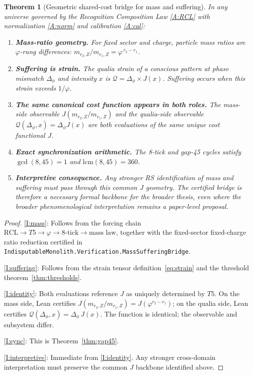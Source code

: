 \documentclass[11pt,a4paper]{article}
\theoremstyle{plain}
\newtheorem{theorem}{Theorem}[section]
\theoremstyle{definition}
\theoremstyle{remark}
\newcommand{\Jcost}{J}
\newcommand{\vp}{\varphi}
\begin{document}
\begin{theorem}[Geometric shared-cost bridge for mass and suffering]
\label{thm:main}
In any universe governed by the Recognition Composition Law
\ref{A:RCL} with normalization \ref{A:norm} and calibration
\ref{A:cal}:
\begin{enumerate}[label=\textup{(\Roman*)}]
\item \textbf{Mass-ratio geometry.}
      For fixed sector and charge, particle mass ratios are
      $\vp$-rung differences:
      $m_{r_2,Z}/m_{r_1,Z} = \vp^{\,r_2-r_1}$.
      \label{I:mass}
\item \textbf{Suffering is strain.}
      The qualia strain of a conscious pattern at phase
      mismatch $\Delta_\phi$ and intensity $x$ is
      $\mathcal{Q} = \Delta_\phi \times \Jcost(x)$.
      Suffering occurs when this strain exceeds $1/\vp$.
      \label{I:suffering}
\item \textbf{The same canonical cost function appears in both roles.}
      The mass-side observable
      $\Jcost(m_{r_2,Z}/m_{r_1,Z})$ and the qualia-side observable
      $\mathcal{Q}(\Delta_\phi,x)=\Delta_\phi\Jcost(x)$ are both
      evaluations of the same unique cost functional $\Jcost$.
      \label{I:identity}
\item \textbf{Exact synchronization arithmetic.}
      The 8-tick and gap-45 cycles satisfy $\gcd(8,45)=1$ and
      $\mathrm{lcm}(8,45)=360$.
      \label{I:sync}
\item \textbf{Interpretive consequence.}
      Any stronger RS identification of mass and suffering must pass
      through this common $\Jcost$ geometry.  The certified bridge is
      therefore a necessary formal backbone for the broader thesis, even
      where the broader phenomenological interpretation remains a
      paper-level proposal.
      \label{I:interpretive}
\end{enumerate}
\end{theorem}

\begin{proof}
\ref{I:mass}: Follows from the forcing chain
$\text{RCL} \to T5 \to \vp \to \text{8-tick} \to
\text{mass law}$, together with the fixed-sector fixed-charge ratio
reduction certified in
\texttt{IndisputableMonolith.Verification.MassSufferingBridge}.

\ref{I:suffering}: Follows from the strain tensor
definition~\eqref{eq:strain} and the threshold
theorem~\ref{thm:thresholds}.

\ref{I:identity}: Both evaluations reference $\Jcost$ as
uniquely determined by $T5$.  On the mass side, Lean certifies
$\Jcost(m_{r_2,Z}/m_{r_1,Z})=\Jcost(\vp^{r_2-r_1})$; on the qualia
side, Lean certifies
$\mathcal{Q}(\Delta_\phi,x)=\Delta_\phi\,\Jcost(x)$.  The function is
identical; the observable and subsystem differ.

\ref{I:sync}: This is Theorem~\ref{thm:gap45}.

\ref{I:interpretive}: Immediate from \ref{I:identity}.  Any stronger
cross-domain interpretation must preserve the common $\Jcost$ backbone
identified above.
\end{proof}
\end{document}
